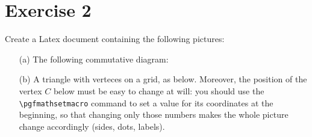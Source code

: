 \documentclass[12pt,a4paper]{article}
\theoremstyle{definition}
\theoremstyle{definition}
\begin{document}
\newpage

\section*{Exercise 2}
Create a Latex document containing the following pictures:
\begin{enumerate}
\item[(a)] The following commutative diagram:
	\begin{center}
	\end{center}
\item[(b)] A triangle with verteces on a grid, as below.
	   Moreover, the position of the vertex $C$ below must be easy to
	   change at will: you should use the
	   \texttt{\textbackslash pgfmathsetmacro} command to set a value
	   for its coordinates at the beginning, so that changing only 
           those numbers makes the whole picture change accordingly (sides,
	   dots, labels).
      \begin{center}
      \end{center}
 
\end{enumerate}

\newpage
\end{document}
